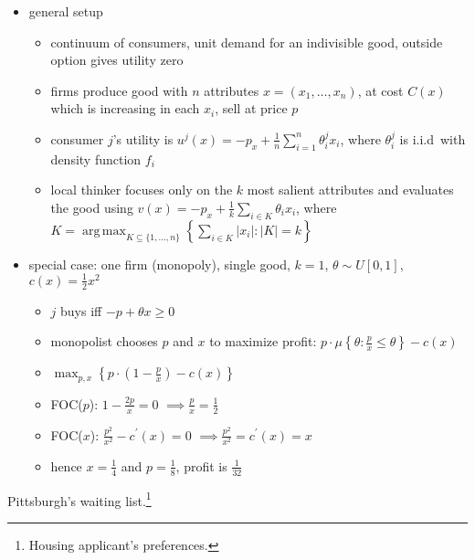 \documentclass{article}
\DeclareMathOperator*{\argmax}{arg\,max}
\begin{document}
\begin{itemize}
    \item general setup
    \begin{itemize}
        \item continuum of consumers, unit demand for an indivisible good, outside option gives utility zero
        \item firms produce good with $n$ attributes $x=(x_1,\dots,x_n)$, at cost $C(x)$ which is increasing in each $x_i$, sell at price $p$
        \item consumer $j$'s  utility is $u^j(x) = -p_x + \frac{1}{n}\sum_{i=1}^n \theta_i^j x_i$, where $\theta_i^j$ is i.i.d\ with density function $f_i$
        \item local thinker focuses only on the $k$ most salient attributes and evaluates the good using $v(x) = -p_x + \frac{1}{k}\sum_{i\in K} \theta_i x_i$, where $K=\argmax_{K\subseteq\{1,\dots,n\}}\left\{\sum_{i \in K}\left \vert x_i \right \vert : \left \vert K \right \vert=k\right\}$
    \end{itemize}
    \item special case: one firm (monopoly), single good, $k=1$, $\theta \sim U[0,1]$, $c(x)=\frac{1}{2}x^2$
    \begin{itemize}
        \item $j$ buys iff $-p+\theta x\geq0$
        \item monopolist chooses $p$ and $x$ to maximize profit: $p\cdot\mu\left\{\theta:\frac{p}{x}\leq\theta\right\}-c(x)$
        \item $\max_{p,x}\left\{p\cdot\left(1-\frac{p}{x}\right)-c(x)\right\}$
        \item FOC($p$): $1-\frac{2p}{x}=0$ $\implies \frac{p}{x} = \frac{1}{2}$
        \item FOC($x$): $\frac{p^2}{x^2}-c^\prime(x)=0$ $\implies \frac{p^2}{x^2} = c^\prime(x) = x$
        \item hence $x=\frac{1}{4}$ and $p=\frac{1}{8}$, profit is $\frac{1}{32}$
    \end{itemize}
\end{itemize}

Pittsburgh's waiting list.\footnote{Housing applicant's preferences.}
\end{document}
